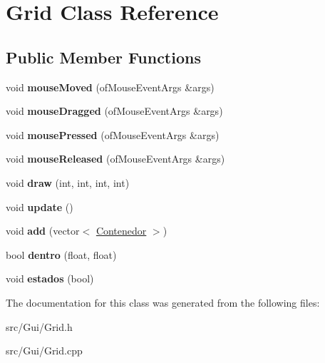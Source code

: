 \hypertarget{class_grid}{}\section{Grid Class Reference}
\label{class_grid}
\subsection*{Public Member Functions}
\begin{DoxyCompactItemize}
\item 
\hypertarget{class_grid_ac33e10bfc470d47cd787138e4ce233e8}{}void {\bfseries mouse\+Moved} (of\+Mouse\+Event\+Args \&args)\label{class_grid_ac33e10bfc470d47cd787138e4ce233e8}

\item 
\hypertarget{class_grid_a0afeb0b6e39e63689a44ae5dda841cb5}{}void {\bfseries mouse\+Dragged} (of\+Mouse\+Event\+Args \&args)\label{class_grid_a0afeb0b6e39e63689a44ae5dda841cb5}

\item 
\hypertarget{class_grid_a1819750566e5534bbb8cea73024fed64}{}void {\bfseries mouse\+Pressed} (of\+Mouse\+Event\+Args \&args)\label{class_grid_a1819750566e5534bbb8cea73024fed64}

\item 
\hypertarget{class_grid_ac55b9fdc613c72d9747ee2b846884df5}{}void {\bfseries mouse\+Released} (of\+Mouse\+Event\+Args \&args)\label{class_grid_ac55b9fdc613c72d9747ee2b846884df5}

\item 
\hypertarget{class_grid_a0b88678e9c4694c8dee7a5ef334a1624}{}void {\bfseries draw} (int, int, int, int)\label{class_grid_a0b88678e9c4694c8dee7a5ef334a1624}

\item 
\hypertarget{class_grid_a517b238168b228a8163496971d98de12}{}void {\bfseries update} ()\label{class_grid_a517b238168b228a8163496971d98de12}

\item 
\hypertarget{class_grid_a9fda46ecc48e648ab751c18b9ab2b8b9}{}void {\bfseries add} (vector$<$ \hyperlink{class_contenedor}{Contenedor} $>$)\label{class_grid_a9fda46ecc48e648ab751c18b9ab2b8b9}

\item 
\hypertarget{class_grid_a7f72b4bd69a7c62c5b0902483a0d62ee}{}bool {\bfseries dentro} (float, float)\label{class_grid_a7f72b4bd69a7c62c5b0902483a0d62ee}

\item 
\hypertarget{class_grid_abff96d7e8fd42ca8f5f6b5efe67548fb}{}void {\bfseries estados} (bool)\label{class_grid_abff96d7e8fd42ca8f5f6b5efe67548fb}

\end{DoxyCompactItemize}


The documentation for this class was generated from the following files\+:\begin{DoxyCompactItemize}
\item 
src/\+Gui/Grid.\+h\item 
src/\+Gui/Grid.\+cpp\end{DoxyCompactItemize}
